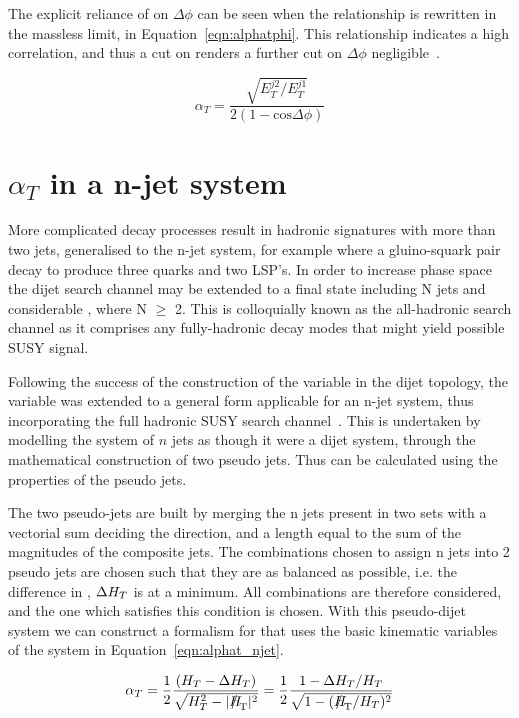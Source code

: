 The explicit reliance of \alt on $\Delta \phi$ can be seen when the relationship is rewritten in the massless limit, in Equation~\ref{eqn:alphatphi}. This relationship indicates a high correlation, and thus a cut on \alt renders a further cut on $\Delta \phi$ negligible~\cite{ANaT}.

\begin{equation}
\alpha_{T} = \frac{\sqrt{E_{T}^{j2}/E_{T}^{j1}}}{2(1- \textrm{cos} \Delta \phi)} 
\label{eqn:alphatphi}
\end{equation}


\section{$\alpha_{T}$ in a n-jet system}
More complicated decay processes result in hadronic signatures with more than two jets, generalised to the n-jet system, for example where a gluino-squark pair decay to produce three quarks and two LSP's. In order to increase phase space the dijet search channel may be extended to a final state including N jets and considerable \met, where N $\geq$ 2. This is colloquially known as the all-hadronic search channel as it comprises any fully-hadronic decay modes that might yield possible SUSY signal. 

Following the success of the construction of the \alt variable in the dijet topology, the variable was extended to a general form applicable for an n-jet system, thus incorporating the full hadronic SUSY search channel~\cite{ANnaT}. This is undertaken by modelling the system of $n$ jets as though it were a dijet system, through the mathematical construction of two pseudo jets. Thus \alt can be calculated using the properties of the pseudo jets. 

The two pseudo-jets are built by merging the n jets present in two sets with a vectorial sum deciding the direction, and a length equal to the sum of the magnitudes of the composite jets. The combinations chosen to assign n jets into 2 pseudo jets are chosen such that they are as balanced as possible, i.e. the difference in \HT, $\Delta H_{T}$ is at a minimum. All combinations are therefore considered, and the one which satisfies this condition is chosen. With this pseudo-dijet system we can construct a formalism for \alt that uses the basic kinematic variables of the system in Equation~\ref{eqn:alphat_njet}. 

\begin{equation}
\alpha_{T} =\frac{1}{2} \frac{(\HT - \Delta \HT)}{\sqrt{\HT^{2} - |\mht|^{2}}}  = \frac{1}{2} \frac{1-\Delta \HT / \HT}{\sqrt{1 - (\mht / \HT)^{2}}}
\label{eqn:alphat_njet}
\end{equation}

